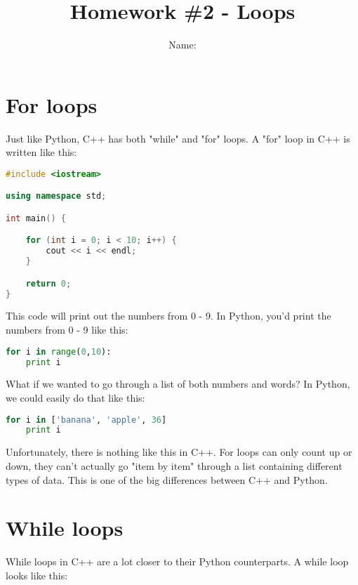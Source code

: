 \documentclass[a4paper,12pt]{article} %
\title{\textbf{Homework \#2 - Loops}}
\author{Name: }
\date{} %
\begin{document}
\maketitle %

\section{For loops}

Just like Python, C++ has both "while" and "for" loops. A "for" loop in C++ is written like this:

\vspace{5mm}
\begin{lstlisting}[language=C++]
#include <iostream>

using namespace std;

int main() {

	for (int i = 0; i < 10; i++) {
		cout << i << endl;
	}

	return 0;
}
\end{lstlisting}

\noindent
This code will print out the numbers from 0 - 9. In Python, you'd print the numbers from 0 - 9 like this:

\vspace{5mm}
\begin{lstlisting}[language=Python]
for i in range(0,10):
	print i
\end{lstlisting}

\noindent
What if we wanted to go through a list of both numbers and words? In Python, we could easily do that like this:

\vspace{5mm}
\begin{lstlisting}[language=Python]
for i in ['banana', 'apple', 36]
	print i
\end{lstlisting}

\noindent
Unfortunately, there is nothing like this in C++. For loops can only count up or down, they can't actually go "item by item" through a list containing different types of data. This is one of the big differences between C++ and Python.

\clearpage

\section{While loops}

While loops in C++ are a lot closer to their Python counterparts. A while loop looks like this:
\end{document}
